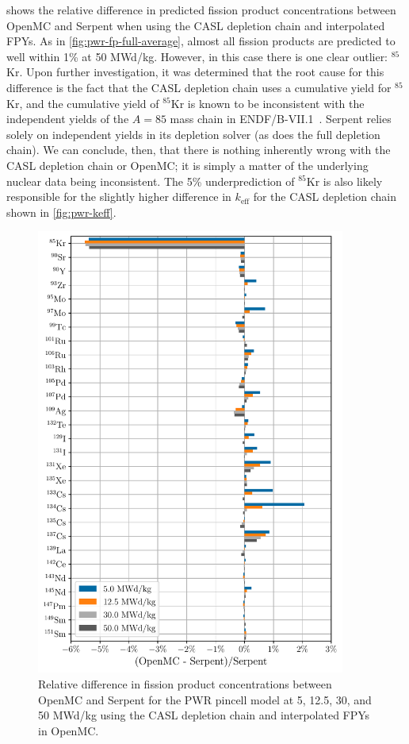 \documentclass[3p,authoryear]{elsarticle}
\begin{document}
 shows the relative difference in predicted
fission product concentrations between OpenMC and Serpent when using the CASL
depletion chain and interpolated FPYs. As in \cref{fig:pwr-fp-full-average},
almost all fission products are predicted to well within 1\% at 50 MWd/kg.
However, in this case there is one clear outlier: $^{85}$Kr. Upon further
investigation, it was determined that the root cause for this difference is the
fact that the CASL depletion chain uses a cumulative yield for $^{85}$Kr, and
the cumulative yield of $^{85}$Kr is known to be inconsistent with the
independent yields of the $A=85$ mass chain in
ENDF/B-VII.1~\citep{pigni2015nds}. Serpent relies solely on independent yields
in its depletion solver (as does the full depletion chain). We can conclude,
then, that there is nothing inherently wrong with the CASL depletion chain or
OpenMC; it is simply a matter of the underlying nuclear data being inconsistent.
The 5\% underprediction of $^{85}$Kr is also likely responsible for the slightly
higher difference in $k_\text{eff}$ for the CASL depletion chain shown in
\cref{fig:pwr-keff}.
\begin{figure}[H]
  \centering
  \includegraphics[width=4in]{figures/pwr_fp_casl_average.pdf}
  \caption{Relative difference in fission product concentrations between OpenMC
  and Serpent for the PWR pincell model at 5, 12.5, 30, and 50 MWd/kg using the
  CASL depletion chain and interpolated FPYs in OpenMC.}
  \label{fig:pwr-fp-casl-average}
\end{figure}
\end{document}

